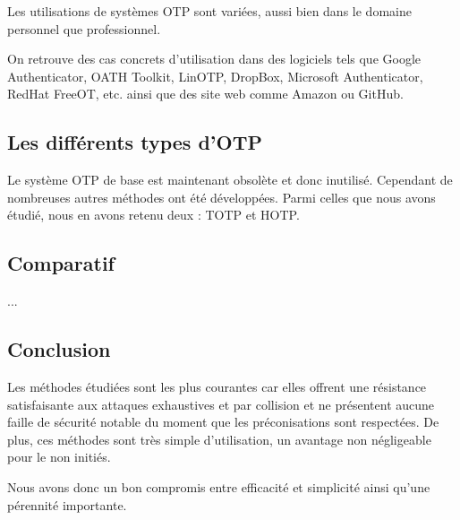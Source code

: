	Les utilisations de systèmes OTP sont variées, aussi bien dans le domaine 
	personnel que professionnel.
	
	On retrouve des cas concrets d'utilisation dans des logiciels tels que Google 
	Authenticator, OATH Toolkit, LinOTP, DropBox, Microsoft Authenticator, RedHat 
	FreeOT, etc. ainsi que des site web comme Amazon ou GitHub.

\subsection{Les différents types d'OTP}

	Le système OTP de base est maintenant obsolète et donc inutilisé. Cependant de
	nombreuses autres méthodes ont été développées. Parmi celles que nous avons 
	étudié, nous en avons retenu deux : TOTP et HOTP.

\subsection{Comparatif}

	...

\subsection{Conclusion}

	Les méthodes étudiées sont les plus courantes car elles offrent une résistance
	satisfaisante aux 	attaques exhaustives et par collision et ne présentent 
	aucune faille de sécurité notable du moment que les préconisations sont 
	respectées. De plus, ces méthodes sont très simple d'utilisation, un avantage
	non négligeable pour le non initiés. 
	
	Nous avons donc un bon compromis entre efficacité et simplicité ainsi qu'une 
	pérennité importante.